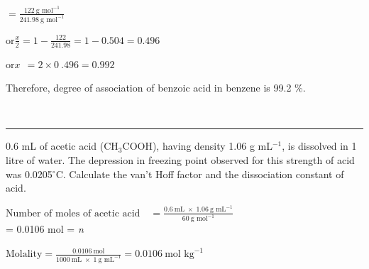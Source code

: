 \documentclass[11pt,a4paper]{article}
\begin{document}
\begin{tcolorbox}[enhanced,colback=white,colframe=gray!40,boxrule=0.8pt,toprule=0pt,sharp corners=north,arc=2mm,left=24pt,right=8pt,top=4pt,bottom=6pt,boxsep=0pt,drop fuzzy shadow=gray!40,overlay={\fill[SkyBlue] (frame.south west) rectangle ([xshift=14pt]frame.north west);}]
\noindent\hfill\begin{minipage}[t]{0.78\linewidth}
\hspace*{5em}$\displaystyle = \frac{122\ \text{g mol}^{-1}}{241.98\ \text{g mol}^{-1}}$

\vspace{4pt}
or\hspace{3em}$\displaystyle \frac{x}{2} = 1 - \frac{122}{241.98} = 1 - 0.504 = 0.496$

or\hspace{3.2em}$x\;\, = 2 \times 0\ .496 = 0.992$

Therefore, degree of association of benzoic acid in benzene is 99.2 \%.
\end{minipage}

\vspace{8pt}
\noindent\begin{minipage}[t]{0.19\linewidth}
\\[-3pt]
{\color{DeepSkyBlue3}\rule{\linewidth}{0.8pt}}
\end{minipage}\hfill
\begin{minipage}[t]{0.78\linewidth}
0.6 mL of acetic acid (CH$_3$COOH), having density 1.06 g mL$^{-1}$, is dissolved in 1 litre of water. The depression in freezing point observed for this strength of acid was 0.0205$^\circ$C. Calculate the van't Hoff factor and the dissociation constant of acid.
\end{minipage}

\vspace{10pt}
\noindent\begin{minipage}[t]{0.19\linewidth}
\end{minipage}\hfill
\begin{minipage}[t]{0.78\linewidth}
\noindent$\displaystyle \text{Number of moles of acetic acid} \quad = \frac{0.6\ \text{mL} \;\times\; 1.06\ \text{g mL}^{-1}}{60\ \text{g mol}^{-1}}$\\
\hspace*{11.6em}= 0.0106 mol = \textit{n}

\noindent$\displaystyle \text{Molality} = \frac{0.0106\ \text{mol}}{1000\ \text{mL} \;\times\; 1\ \text{g mL}^{-1}} = 0.0106\ \text{mol kg}^{-1}$


\end{minipage}
\end{tcolorbox}
\end{document}
